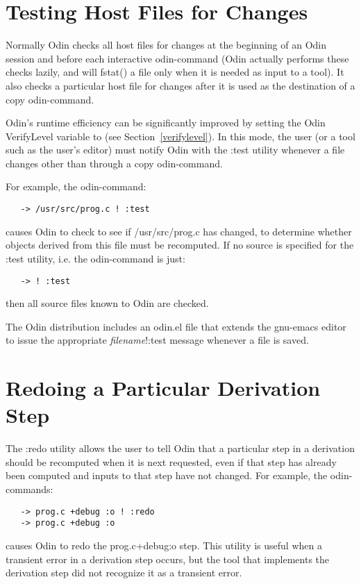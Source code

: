 \section{Testing Host Files for Changes}

Normally Odin checks all host files for changes
at the beginning of an Odin session and before each interactive
odin-command (Odin actually performs these checks lazily,
and will {\ex fstat()} a file only when it is needed
as input to a tool).
It also checks a particular host file for changes after
it is used as the destination of a copy odin-command.

Odin's runtime efficiency can be significantly improved by setting
the Odin {\ex VerifyLevel} variable to {}
(see Section~\ref{verifylevel}).
In this mode, the user (or a tool such as the user's editor)
must notify Odin with the {\ex :test} utility
whenever a file changes other than through a copy odin-command.

For example, the odin-command:
\begin{verbatim}
   -> /usr/src/prog.c ! :test
\end{verbatim}
causes Odin to check to see if {\ex /usr/src/prog.c} has changed,
to determine whether objects derived from this file must be recomputed.
If no source is specified for the {\ex :test} utility,
i.e. the odin-command is just:
\begin{verbatim}
   -> ! :test
\end{verbatim}
then all source files known to Odin are checked.

The Odin distribution includes an {\ex odin.el} file
that extends the gnu-emacs editor to issue the appropriate
{\em filename}{\ex!:test} message whenever a file is saved.

\section{Redoing a Particular Derivation Step}

The {\ex :redo} utility allows the user to tell Odin that
a particular step in a derivation should be recomputed
when it is next requested,
even if that step has already been computed and
inputs to that step have not changed.
For example, the odin-commands:
\begin{verbatim}
   -> prog.c +debug :o ! :redo
   -> prog.c +debug :o
\end{verbatim}
causes Odin to redo the {\ex prog.c+debug:o} step.
This utility is useful when a transient error in a derivation step occurs,
but the tool that implements the derivation step did not recognize it as
a transient error.

